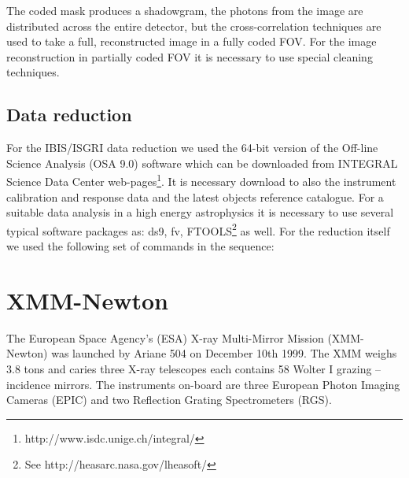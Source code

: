 \documentclass[oneside,a4paper,11pt]{report}
\begin{document}
The coded mask produces a shadowgram, the photons from the image are distributed across the entire detector, 
but the cross-correlation techniques are used to take a full, reconstructed image in a fully coded FOV. 
For the image reconstruction in partially coded FOV it is necessary to use special cleaning techniques.

\subsection{Data reduction}
For the IBIS/ISGRI data reduction we used the 64-bit version of the Off-line Science Analysis (OSA 9.0) 
software which can be downloaded from INTEGRAL Science Data Center web-pages\footnote{http://www.isdc.unige.ch/integral/}. 
It is necessary download to also the instrument calibration and response data and the latest 
objects reference catalogue.
For a suitable data analysis in a high energy astrophysics it is necessary to use several 
typical software packages as: ds9, fv, FTOOLS\footnote{See http://heasarc.nasa.gov/lheasoft/} as well.       
For the reduction itself we used the following set of commands in the sequence:



\section{XMM-Newton}
The European Space Agency's (ESA) X-ray Multi-Mirror Mission (XMM-Newton) was launched by Ariane 504 
on December 10th 1999. The XMM weighs 3.8 tons and caries three X-ray telescopes each contains 58 Wolter I 
grazing -- incidence mirrors. The instruments on-board are three European Photon Imaging Cameras (EPIC) 
and two Reflection Grating Spectrometers (RGS).
\end{document}

